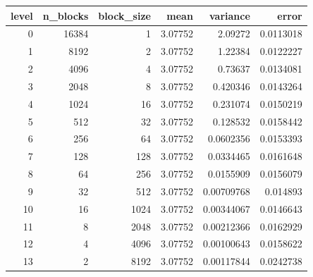 \begin{tabular}{rrrrrr}
\toprule
level & n_blocks & block_size & mean & variance & error \\
\midrule
0 & 16384 & 1 & 3.07752 & 2.09272 & 0.0113018 \\
1 & 8192 & 2 & 3.07752 & 1.22384 & 0.0122227 \\
2 & 4096 & 4 & 3.07752 & 0.73637 & 0.0134081 \\
3 & 2048 & 8 & 3.07752 & 0.420346 & 0.0143264 \\
4 & 1024 & 16 & 3.07752 & 0.231074 & 0.0150219 \\
5 & 512 & 32 & 3.07752 & 0.128532 & 0.0158442 \\
6 & 256 & 64 & 3.07752 & 0.0602356 & 0.0153393 \\
7 & 128 & 128 & 3.07752 & 0.0334465 & 0.0161648 \\
8 & 64 & 256 & 3.07752 & 0.0155909 & 0.0156079 \\
9 & 32 & 512 & 3.07752 & 0.00709768 & 0.014893 \\
10 & 16 & 1024 & 3.07752 & 0.00344067 & 0.0146643 \\
11 & 8 & 2048 & 3.07752 & 0.00212366 & 0.0162929 \\
12 & 4 & 4096 & 3.07752 & 0.00100643 & 0.0158622 \\
13 & 2 & 8192 & 3.07752 & 0.00117844 & 0.0242738 \\
\bottomrule
\end{tabular}
